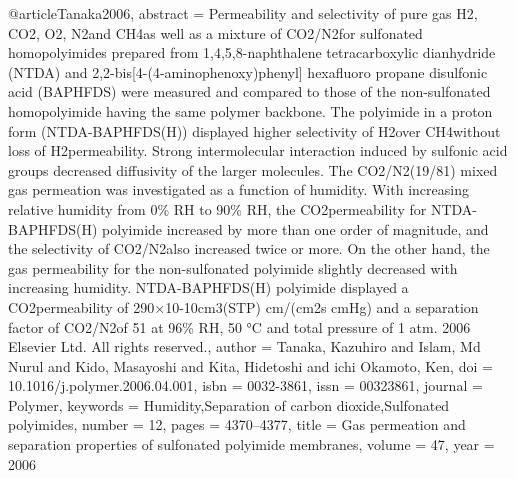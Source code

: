 @article{Tanaka2006,
abstract = {Permeability and selectivity of pure gas H2, CO2, O2, N2and CH4as well as a mixture of CO2/N2for sulfonated homopolyimides prepared from 1,4,5,8-naphthalene tetracarboxylic dianhydride (NTDA) and 2,2-bis[4-(4-aminophenoxy)phenyl] hexafluoro propane disulfonic acid (BAPHFDS) were measured and compared to those of the non-sulfonated homopolyimide having the same polymer backbone. The polyimide in a proton form (NTDA-BAPHFDS(H)) displayed higher selectivity of H2over CH4without loss of H2permeability. Strong intermolecular interaction induced by sulfonic acid groups decreased diffusivity of the larger molecules. The CO2/N2(19/81) mixed gas permeation was investigated as a function of humidity. With increasing relative humidity from 0{\%} RH to 90{\%} RH, the CO2permeability for NTDA-BAPHFDS(H) polyimide increased by more than one order of magnitude, and the selectivity of CO2/N2also increased twice or more. On the other hand, the gas permeability for the non-sulfonated polyimide slightly decreased with increasing humidity. NTDA-BAPHFDS(H) polyimide displayed a CO2permeability of 290×10-10cm3(STP) cm/(cm2s cmHg) and a separation factor of CO2/N2of 51 at 96{\%} RH, 50 °C and total pressure of 1 atm. {\textcopyright} 2006 Elsevier Ltd. All rights reserved.},
author = {Tanaka, Kazuhiro and Islam, Md Nurul and Kido, Masayoshi and Kita, Hidetoshi and ichi Okamoto, Ken},
doi = {10.1016/j.polymer.2006.04.001},
isbn = {0032-3861},
issn = {00323861},
journal = {Polymer},
keywords = {Humidity,Separation of carbon dioxide,Sulfonated polyimides},
number = {12},
pages = {4370--4377},
title = {{Gas permeation and separation properties of sulfonated polyimide membranes}},
volume = {47},
year = {2006}
}
